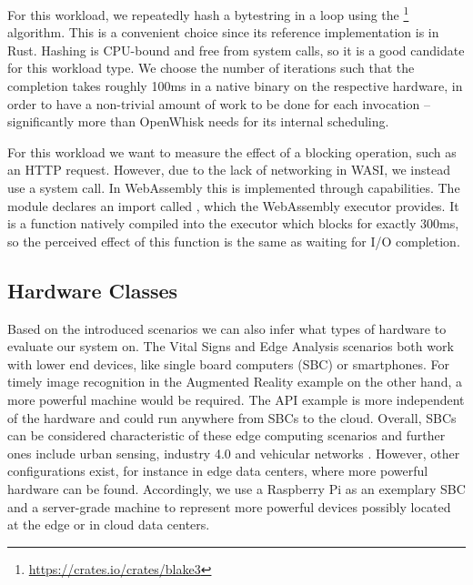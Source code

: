 \begin{description}[style=multiline, leftmargin=2.5cm, font=\bfseries]
    \item[CPU-bound] For this workload, we repeatedly hash a bytestring in a loop using the \footnote{\url{https://crates.io/crates/blake3}} algorithm. This is a convenient choice since its reference implementation is in Rust. Hashing is CPU-bound and free from system calls, so it is a good candidate for this workload type. We choose the number of iterations such that the completion takes roughly 100ms in a native binary on the respective hardware, in order to have a non-trivial amount of work to be done for each invocation -- significantly more than OpenWhisk needs for its internal scheduling.
    \item[I/O-bound] For this workload we want to measure the effect of a blocking operation, such as an HTTP request. However, due to the lack of networking in WASI, we instead use a  system call. In WebAssembly this is implemented through capabilities. The module declares an import called , which the WebAssembly executor provides. It is a function natively compiled into the executor which blocks for exactly 300ms, so the perceived effect of this function is the same as waiting for I/O completion.
\end{description}

\subsection{Hardware Classes}

Based on the introduced scenarios we can also infer what types of hardware to evaluate our system on. The Vital Signs  and Edge Analysis scenarios both work with lower end devices, like single board computers (SBC) or smartphones. For timely image recognition in the Augmented Reality example on the other hand, a more powerful machine would be required. The API example is more independent of the hardware and could run anywhere from SBCs to the cloud. 
Overall, SBCs can be considered characteristic of these edge computing scenarios and further ones include urban sensing, industry 4.0 and vehicular networks \cite{Rausch2020}. However, other configurations exist, for instance in edge data centers, where more powerful hardware can be found.
Accordingly, we use a Raspberry Pi as an exemplary SBC and a server-grade machine to represent more powerful devices possibly located at the edge or in cloud data centers.

